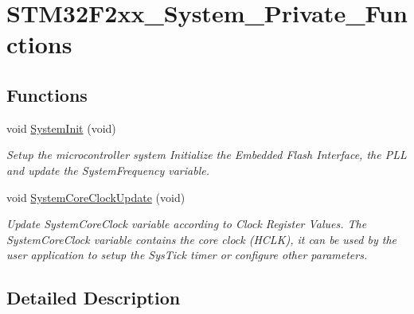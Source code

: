\hypertarget{group___s_t_m32_f2xx___system___private___functions}{\section{S\-T\-M32\-F2xx\-\_\-\-System\-\_\-\-Private\-\_\-\-Functions}
\label{group___s_t_m32_f2xx___system___private___functions}
}
\subsection*{Functions}
\begin{DoxyCompactItemize}
\item 
void \hyperlink{group___s_t_m32_f2xx___system___private___functions_ga93f514700ccf00d08dbdcff7f1224eb2}{System\-Init} (void)
\begin{DoxyCompactList}\small\item\em Setup the microcontroller system Initialize the Embedded Flash Interface, the P\-L\-L and update the System\-Frequency variable. \end{DoxyCompactList}\item 
void \hyperlink{group___s_t_m32_f2xx___system___private___functions_gae0c36a9591fe6e9c45ecb21a794f0f0f}{System\-Core\-Clock\-Update} (void)
\begin{DoxyCompactList}\small\item\em Update System\-Core\-Clock variable according to Clock Register Values. The System\-Core\-Clock variable contains the core clock (H\-C\-L\-K), it can be used by the user application to setup the Sys\-Tick timer or configure other parameters. \end{DoxyCompactList}\end{DoxyCompactItemize}


\subsection{Detailed Description}


